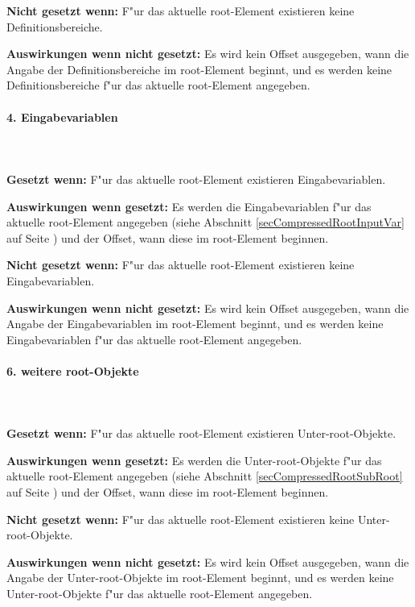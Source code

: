 \bigskip\noindent
\textbf{Nicht gesetzt wenn:} F"ur das aktuelle root-Element existieren keine Definitionsbereiche.

\bigskip\noindent
\textbf{Auswirkungen wenn nicht gesetzt:}
Es wird kein Offset ausgegeben, wann die Angabe der Definitionsbereiche im root-Element beginnt, und es werden keine Definitionsbereiche f"ur das aktuelle root-Element angegeben.


\paragraph{4. Eingabevariablen}

\ \\\\\noindent
\textbf{Gesetzt wenn:} F"ur das aktuelle root-Element existieren Eingabevariablen.

\bigskip\noindent
\textbf{Auswirkungen wenn gesetzt:}
Es werden die Eingabevariablen f"ur das aktuelle root-Element angegeben (siehe Abschnitt \ref{secCompressedRootInputVar} auf Seite \pageref{secCompressedRootInputVar}) und der Offset, wann diese im root-Element beginnen.

\bigskip\noindent
\textbf{Nicht gesetzt wenn:} F"ur das aktuelle root-Element existieren keine Eingabevariablen.

\bigskip\noindent
\textbf{Auswirkungen wenn nicht gesetzt:}
Es wird kein Offset ausgegeben, wann die Angabe der Eingabevariablen im root-Element beginnt, und es werden keine Eingabevariablen f"ur das aktuelle root-Element angegeben.


\paragraph{6. weitere root-Objekte}

\ \\\\\noindent
\textbf{Gesetzt wenn:} F"ur das aktuelle root-Element existieren Unter-root-Objekte.

\bigskip\noindent
\textbf{Auswirkungen wenn gesetzt:}
Es werden die Unter-root-Objekte f"ur das aktuelle root-Element angegeben (siehe Abschnitt \ref{secCompressedRootSubRoot} auf Seite \pageref{secCompressedRootSubRoot}) und der Offset, wann diese im root-Element beginnen.

\bigskip\noindent
\textbf{Nicht gesetzt wenn:} F"ur das aktuelle root-Element existieren keine Unter-root-Objekte.

\bigskip\noindent
\textbf{Auswirkungen wenn nicht gesetzt:}
Es wird kein Offset ausgegeben, wann die Angabe der Unter-root-Objekte im root-Element beginnt, und es werden keine Unter-root-Objekte f"ur das aktuelle root-Element angegeben.


